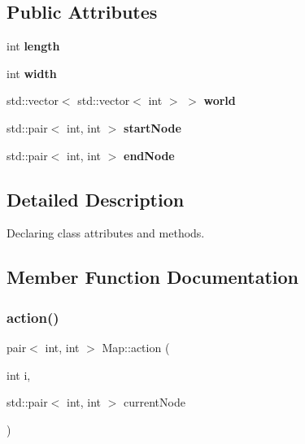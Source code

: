 \subsection*{Public Attributes}
\begin{DoxyCompactItemize}
\item 
\mbox{\label{classMap_aac7953fc14004f33f94dd8f8a0e97fd8}} 
int {\bfseries length}
\item 
\mbox{\label{classMap_a9ecfe932ad2d2bc22492416033bdacfd}} 
int {\bfseries width}
\item 
\mbox{\label{classMap_ab80c96f0d21466e10a624f72f2716898}} 
std\+::vector$<$ std\+::vector$<$ int $>$ $>$ {\bfseries world}
\item 
\mbox{\label{classMap_a31ba0736efdbeb24b297c2fa9661c6b7}} 
std\+::pair$<$ int, int $>$ {\bfseries start\+Node}
\item 
\mbox{\label{classMap_a054effa203c9a8572498f3c3babd28ee}} 
std\+::pair$<$ int, int $>$ {\bfseries end\+Node}
\end{DoxyCompactItemize}


\subsection{Detailed Description}
Declaring class attributes and methods. 

\subsection{Member Function Documentation}
\mbox{\label{classMap_a0174318a971eef891af7248906fd50e6}} 
\subsubsection{\texorpdfstring{action()}{action()}}
{\footnotesize\ttfamily pair$<$ int, int $>$ Map\+::action (\begin{DoxyParamCaption}\item[{int}]{i,  }\item[{std\+::pair$<$ int, int $>$}]{current\+Node }\end{DoxyParamCaption})}



